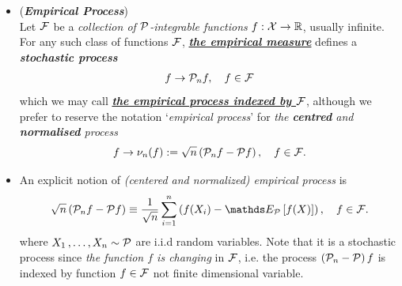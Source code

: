 \documentclass[11pt]{article}
\begin{document}
\begin{itemize}
\item \begin{definition} (\textbf{\emph{Empirical Process}})  \citep{wellner2013weak, gine2021mathematical} \\
Let ${\mathcal F}$ be a \emph{collection of ${\mathcal P}$-integrable functions} $f: {\mathcal X} \to {\mathbb R}$, usually infinite. For any such class of functions ${\mathcal F}$, \underline{\emph{\textbf{the empirical measure}}} defines a \emph{\textbf{stochastic process}}
\begin{align}
f \rightarrow {\mathcal P}_{n}f, \quad f\in {\mathcal F} \label{def: empirical_process}
\end{align} which we may call  \underline{\emph{\textbf{the empirical process indexed by ${\mathcal F}$}}}, although we prefer to reserve the
notation `\emph{empirical process}' for \emph{the \textbf{centred} and \textbf{normalised} process}
\begin{align}
f \rightarrow \nu_{n}(f) :=\sqrt{n} \left({\mathcal P}_n f - {\mathcal P} f\right), \quad f\in {\mathcal F}. \label{def: centered_empirical_process}
\end{align}
\end{definition}

\item \begin{remark}
An explicit notion of \emph{(centered and normalized) empirical process} is
\begin{align*}
\sqrt{n} \paren{\cP_n f - \cP f} \equiv \frac{1}{\sqrt{n}}\sum_{i=1}^n\paren{f(X_i) - \E{\cP}{f(X)}}, \quad f\in \cF.
\end{align*} where $X_1 \,{,}\ldots{,}\, X_n \sim {\mathcal P}$ are i.i.d random variables. Note that it is a stochastic process since \emph{the function $f$ is changing} in ${\mathcal F}$, i.e. the process $\left({\mathcal P}_n  - {\mathcal P}\right)f$ is indexed by function $f \in {\mathcal F}$ not finite dimensional variable.
\end{remark}




\end{itemize}
\end{document}
